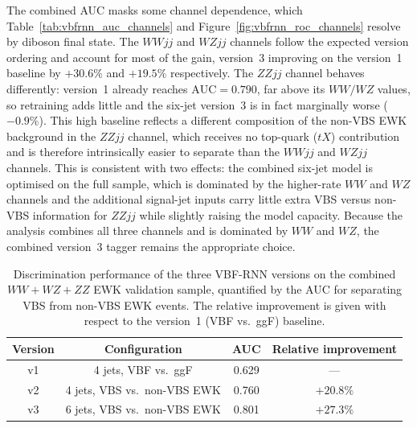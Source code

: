 The combined AUC masks some channel dependence, which Table~\ref{tab:vbfrnn_auc_channels} and Figure~\ref{fig:vbfrnn_roc_channels} resolve by diboson final state. The $WWjj$ and $WZjj$ channels follow the expected version ordering and account for most of the gain, version~3 improving on the version~1 baseline by $+30.6\%$ and $+19.5\%$ respectively. The $ZZjj$ channel behaves differently: version~1 already reaches $\mathrm{AUC}=0.790$, far above its $WW/WZ$ values, so retraining adds little and the six-jet version~3 is in fact marginally worse ($-0.9\%$). This high baseline reflects a different composition of the non-VBS EWK background in the $ZZjj$ channel, which receives no top-quark ($tX$) contribution and is therefore intrinsically easier to separate than the $WWjj$ and $WZjj$ channels. This is consistent with two effects: the combined six-jet model is optimised on the full sample, which is dominated by the higher-rate $WW$ and $WZ$ channels and the additional signal-jet inputs carry little extra VBS versus non-VBS information for $ZZjj$ while slightly raising the model capacity. Because the analysis combines all three channels and is dominated by $WW$ and $WZ$, the combined version~3 tagger remains the appropriate choice.

\begin{table}[htbp]
  \centering
  \caption{Discrimination performance of the three VBF-RNN versions on the combined $WW+WZ+ZZ$ EWK validation sample, quantified by the AUC for separating VBS from non-VBS EWK events. The relative improvement is given with respect to the version~1 (VBF vs.\ ggF) baseline.}
  \label{tab:vbfrnn_auc}
  \begin{tabular}{|c|c|c|c|}
    \hline
    \textbf{Version} & \textbf{Configuration} & \textbf{AUC} & \textbf{Relative improvement} \\
    \hline
    v1 & 4 jets, VBF vs.\ ggF         & 0.629 & --- \\
    v2 & 4 jets, VBS vs.\ non-VBS EWK & 0.760 & $+20.8\%$ \\
    v3 & 6 jets, VBS vs.\ non-VBS EWK & 0.801 & $+27.3\%$ \\
    \hline
  \end{tabular}
\end{table}

